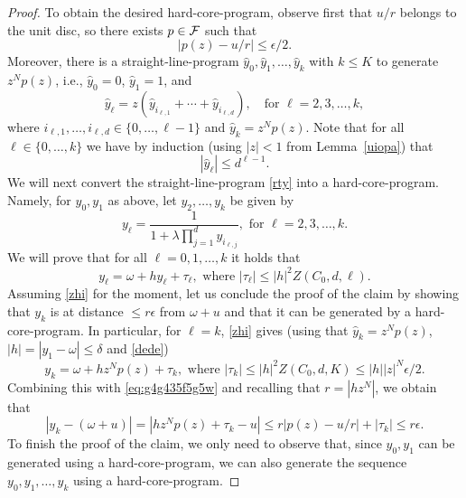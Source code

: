 \documentclass[11pt]{article}
\newcommand{\eps}{\epsilon}
\begin{document}
\begin{proof}
To obtain the desired hard-core-program, observe first that $u/r$ belongs to the unit disc, so there exists $p\in {\cal F}$ such that 
\begin{equation}\label{eq:g4g435f5g5w}
|p(z)-u/r|\leq\eps/2.
\end{equation}
Moreover, there is a straight-line-program $\hat{y}_0, \hat{y}_1,\hdots,\hat{y}_k$ with $k\leq K$ to generate $z^Np(z)$, i.e., $\hat{y}_0=0$, $\hat{y}_1=1$, and 
\begin{equation}\label{rty}
\hat{y}_\ell = z \left(\hat{y}_{i_{\ell,1}}+\cdots+\hat{y}_{i_{\ell,d}}\right),\quad\mbox{for $\ell=2,3,\dots,k$},
\end{equation}
where $i_{\ell,1},\dots,i_{\ell,d}\in\{0,\dots,\ell-1\}$ and $\hat{y}_k=z^Np(z)$.  Note that for all $\ell\in\{0,\dots,k\}$ we have
by induction (using $|z|<1$ from  Lemma~\ref{uiopa}) that
\begin{equation}\label{yuop}
|\hat{y}_\ell|\leq d^{\ell-1}.
\end{equation}
We will next convert the straight-line-program \eqref{rty} into a hard-core-program. Namely, for $y_0,y_1$ as above,  let $y_2,\dots,y_k$ be given by
\begin{equation}\label{rty2}
y_\ell = \frac{1}{1+\lambda \prod_{j=1}^d y_{i_{\ell,j}}}, \mbox{ for $\ell=2,3,\dots,k$}.
\end{equation}
We will prove that for all $\ell=0,1,\hdots, k$ it holds that
\begin{equation}\label{zhi}
y_\ell = \omega + h \hat{y}_\ell + \tau_\ell,\mbox{ where } |\tau_\ell|\leq |h|^2 Z(C_0,d,\ell).
\end{equation}
Assuming \eqref{zhi} for the moment, let us conclude the proof of the claim by showing that  $y_k$ is at distance $\leq r\eps$ from $\omega+u$ and that it can be generated by a hard-core-program.  In particular, for $\ell=k$, \eqref{zhi} gives  (using that $\hat{y}_k=z^N p(z)$, $|h|=|y_1-\omega|\leq\delta$ and \eqref{dede})
\[y_k=\omega+h z^N p(z) + \tau_k, \mbox{ where $|\tau_k|\leq |h|^2 Z(C_0,d,K)\leq |h| |z|^N\epsilon/2$}.\]
Combining this with \eqref{eq:g4g435f5g5w} and recalling that $r=|h z^N|$, we obtain that
\[|y_k - (\omega+u)| = |hz^N p(z) + \tau_k  - u | \leq  r |p(z) -u/r|+|\tau_k|\leq  r\eps.\]
To finish the proof of the claim, we only need to observe that, since $y_0,y_1$ can be generated using a hard-core-program, we can also generate the sequence $y_0,y_1,\hdots,y_k$ using a hard-core-program.





\end{proof}
\end{document}
